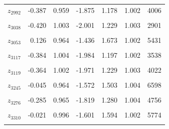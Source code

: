 \begin{longtable}{lrrrrrr}
$z_{2992}$ & -0.387 & 0.959 & -1.875 & 1.178 & 1.002 & 4006\\
\cellcolor{gray!10}{$z_{3002}$} & \cellcolor{gray!10}{0.090} & \cellcolor{gray!10}{0.951} & \cellcolor{gray!10}{-1.415} & \cellcolor{gray!10}{1.608} & \cellcolor{gray!10}{1.001} & \cellcolor{gray!10}{6286}\\
$z_{3038}$ & -0.420 & 1.003 & -2.001 & 1.229 & 1.003 & 2901\\
\cellcolor{gray!10}{$z_{3039}$} & \cellcolor{gray!10}{0.046} & \cellcolor{gray!10}{1.002} & \cellcolor{gray!10}{-1.553} & \cellcolor{gray!10}{1.641} & \cellcolor{gray!10}{1.003} & \cellcolor{gray!10}{6672}\\
$z_{3053}$ & 0.126 & 0.964 & -1.436 & 1.673 & 1.002 & 5431\\
\cellcolor{gray!10}{$z_{3116}$} & \cellcolor{gray!10}{0.116} & \cellcolor{gray!10}{0.950} & \cellcolor{gray!10}{-1.367} & \cellcolor{gray!10}{1.635} & \cellcolor{gray!10}{1.002} & \cellcolor{gray!10}{6387}\\
$z_{3117}$ & -0.384 & 1.004 & -1.984 & 1.197 & 1.002 & 3538\\
\cellcolor{gray!10}{$z_{3118}$} & \cellcolor{gray!10}{-0.365} & \cellcolor{gray!10}{0.990} & \cellcolor{gray!10}{-1.958} & \cellcolor{gray!10}{1.233} & \cellcolor{gray!10}{1.001} & \cellcolor{gray!10}{3706}\\
$z_{3119}$ & -0.364 & 1.002 & -1.971 & 1.229 & 1.003 & 4022\\
\cellcolor{gray!10}{$z_{3120}$} & \cellcolor{gray!10}{0.222} & \cellcolor{gray!10}{0.959} & \cellcolor{gray!10}{-1.315} & \cellcolor{gray!10}{1.732} & \cellcolor{gray!10}{0.999} & \cellcolor{gray!10}{5238}\\
$z_{3245}$ & -0.045 & 0.964 & -1.572 & 1.503 & 1.004 & 6598\\
\cellcolor{gray!10}{$z_{3255}$} & \cellcolor{gray!10}{-0.061} & \cellcolor{gray!10}{0.985} & \cellcolor{gray!10}{-1.623} & \cellcolor{gray!10}{1.515} & \cellcolor{gray!10}{1.001} & \cellcolor{gray!10}{8113}\\
$z_{3276}$ & -0.285 & 0.965 & -1.819 & 1.280 & 1.004 & 4756\\
\cellcolor{gray!10}{$z_{3303}$} & \cellcolor{gray!10}{-0.064} & \cellcolor{gray!10}{0.980} & \cellcolor{gray!10}{-1.643} & \cellcolor{gray!10}{1.491} & \cellcolor{gray!10}{1.005} & \cellcolor{gray!10}{5965}\\
$z_{3310}$ & -0.021 & 0.996 & -1.601 & 1.594 & 1.002 & 5774\\
\cellcolor{gray!10}{$z_{3333}$} & \cellcolor{gray!10}{-0.005} & \cellcolor{gray!10}{1.020} & \cellcolor{gray!10}{-1.641} & \cellcolor{gray!10}{1.593} & \cellcolor{gray!10}{1.001} & \cellcolor{gray!10}{6249}\\

\end{longtable}

